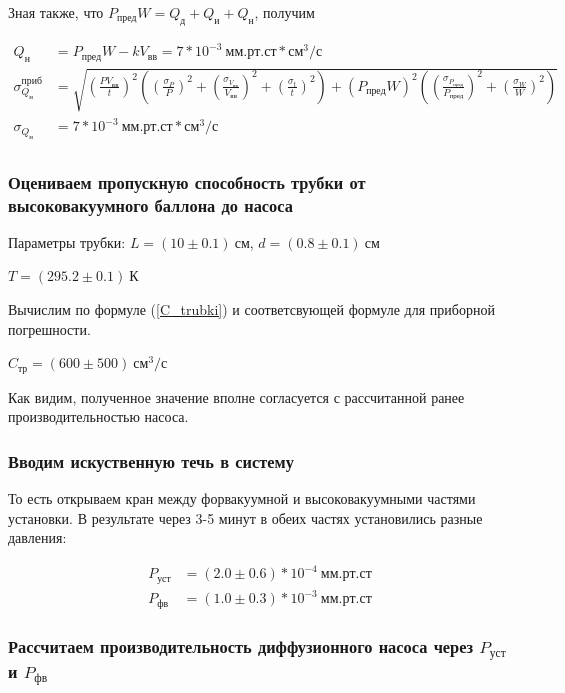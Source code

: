 \documentclass[a4paper, 12pt]{article}
\begin{document}
            Зная также, что $P_{пред}W = Q_д + Q_и + Q_н$, получим

            \begin{align*}
                Q_н &= P_{пред} W - k V_{вв} = 7 * 10^{-3}~мм.рт.ст*см^3/с\\
                \sigma_{Q_н}^{приб} &= \sqrt{ \left( \frac{P V_{вв}}{t} \right)^2 \left( \left( \frac{\sigma_P}{P} \right)^2 + \left( \frac{\sigma_{V_{вв}}}{V_{вв}} \right)^2 + \left( \frac{\sigma_t}{t} \right)^2 \right) + \left( P_{пред} W \right)^2 \left( \left( \frac{\sigma_{P_{пред}}}{P_{пред}} \right)^2 + \left( \frac{\sigma_W}{W} \right)^2 \right)}\\
                \sigma_{Q_н} &= 7 * 10^{-3}~мм.рт.ст*см^3/с\\
            \end{align*}

        \subsubsection{Оцениваем пропускную способность трубки от высоковакуумного баллона до насоса}

            Параметры трубки: $L = (10 \pm 0.1)~см$, $d = (0.8 \pm 0.1)~см$

            $T = (295.2 \pm 0.1)~К$

            Вычислим по формуле (\ref{C_trubki}) и соответсвующей формуле для приборной погрешности.

            $C_{тр} = (600 \pm 500)~см^3/с$

            Как видим, полученное значение вполне согласуется с рассчитанной ранее производительностью насоса.

        \subsubsection{Вводим искуственную течь в систему}

            То есть открываем кран между форвакуумной и высоковакуумными частями установки. В результате через 3-5 минут в обеих частях установились разные давления:

            \begin{align*}
                P_{уст} &= (2.0 \pm 0.6)*10^{-4}~мм.рт.ст\\
                P_{фв} &= (1.0 \pm 0.3)*10^{-3}~мм.рт.ст
            \end{align*}

        \subsubsection{Рассчитаем производительность диффузионного насоса через $P_{уст}$ и $P_{фв}$}
\end{document}
